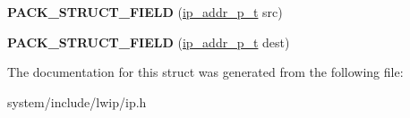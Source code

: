 \begin{DoxyCompactItemize}
\item 
\hypertarget{structip__hdr_a5d6152fc140e12c611356c54147e91e1}{}{\bfseries P\+A\+C\+K\+\_\+\+S\+T\+R\+U\+C\+T\+\_\+\+F\+I\+E\+L\+D} (\hyperlink{structip__addr__packed}{ip\+\_\+addr\+\_\+p\+\_\+t} src)\label{structip__hdr_a5d6152fc140e12c611356c54147e91e1}

\item 
\hypertarget{structip__hdr_a7e0bc4d66ad8a63251fd83c7168077a3}{}{\bfseries P\+A\+C\+K\+\_\+\+S\+T\+R\+U\+C\+T\+\_\+\+F\+I\+E\+L\+D} (\hyperlink{structip__addr__packed}{ip\+\_\+addr\+\_\+p\+\_\+t} dest)\label{structip__hdr_a7e0bc4d66ad8a63251fd83c7168077a3}

\end{DoxyCompactItemize}


The documentation for this struct was generated from the following file\+:\begin{DoxyCompactItemize}
\item 
system/include/lwip/ip.\+h\end{DoxyCompactItemize}

